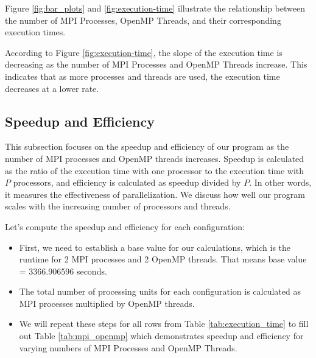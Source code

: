\documentclass{solutionclass} %
\begin{document}
Figure \ref{fig:bar_plots} and \ref{fig:execution-time} illustrate the relationship between the number of MPI Processes, OpenMP Threads, and their corresponding execution times. 

According to Figure \ref{fig:execution-time}, the slope of the execution time is decreasing as the number of MPI Processes and OpenMP Threads increase. This indicates that as more processes and threads are used, the execution time decreases at a lower rate.

\subsection{Speedup and Efficiency}
This subsection focuses on the speedup and efficiency of our program as the number of MPI processes and OpenMP threads increases. Speedup is calculated as the ratio of the execution time with one processor to the execution time with $P$ processors, and efficiency is calculated as speedup divided by $P$. In other words, it measures the effectiveness of parallelization. We discuss how well our program scales with the increasing number of processors and threads.

Let's compute the speedup and efficiency for each configuration:
\begin{itemize}
    \item First, we need to establish a base value for our calculations, which is the runtime for 2 MPI processes and 2 OpenMP threads. That means base value = 3366.906596 seconds.
    \item The total number of processing units for each configuration is calculated as MPI processes multiplied by OpenMP threads.
    \item We will repeat these steps for all rows from Table \ref{tab:execution_time} to fill out Table \ref{tab:mpi_openmp} which demonstrates speedup and efficiency for varying numbers of MPI Processes and OpenMP Threads.
\end{itemize}
\end{document}
